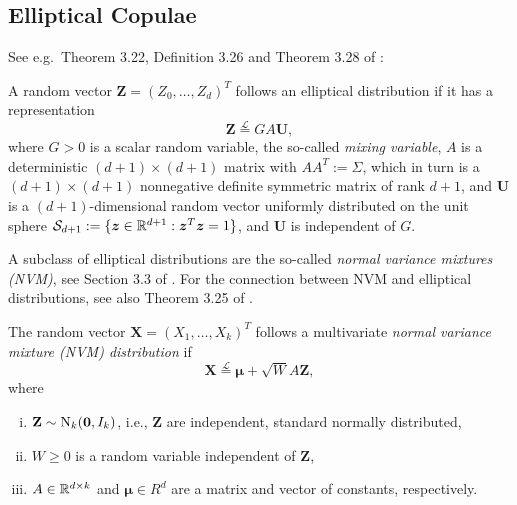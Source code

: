 \subsection{Elliptical Copulae}\label{subsec:elliptical-copulae}


\providecommand{\bZ}{\ensuremath{\bm{Z}}}
\providecommand{\bU}{\ensuremath{\bm{U}}}
\providecommand{\bu}{\ensuremath{\bm{u}}}

See e.g.\ Theorem 3.22, Definition 3.26 and Theorem 3.28 of
\citep{McNeil2005}:
\begin{definition}
  A random vector $\bZ=(Z_0,\ldots, Z_d)^T$ follows an elliptical
  distribution if it has a representation
  \begin{equation*}
    \bZ\stackrel{\mathcal L}= G A \bU,
  \end{equation*}
  where $G>0$ is a scalar random variable, the so-called {\em mixing
  variable}, $A$ is a deterministic $(d+1)\times (d+1)$ matrix with
$A A^T:=\Sigma$, which in turn is a $(d+1)\times (d+1)$ nonnegative
definite symmetric matrix of rank $d+1$, and $\bU$ is a
$(d+1)$-dimensional random vector uniformly distributed on the unit
sphere $\mathcal S_{d+1}:=\{\bm{z}\in {\mathbb{R}}^{d+1}: \bm z^T \bm z=1\}$,
and $\bU$ is independent of $G$.
\end{definition}

A subclass of elliptical distributions are the so-called {\em normal
  variance mixtures (NVM)}, see Section 3.3 of \citep{McNeil2005}. For the
connection between NVM and elliptical distributions, see also Theorem
3.25 of \citep{McNeil2005}. 

\begin{definition}
  The random vector $\mathbf X=(X_1, \ldots, X_k)^T$ follows a
  multivariate {\em normal variance mixture (NVM) distribution} if
  \begin{equation*}
    \mathbf X \stackrel{\mathcal L}{=} \mathbf \mu + \sqrt{W} A\mathbf
    Z, 
  \end{equation*}
  where
  \begin{enumerate}[(i)]
  \item $\mathbf Z\sim {\rm N}_k(\mathbf 0, I_k)$, i.e., $\mathbf Z$ are
    independent, standard normally distributed,
  \item $W\geq 0$ is a random variable independent of $\mathbf Z$,
  \item $A\in {\mathbb{R}}^{d\times k}$ and $\mathbf \mu\in R^d$ are a matrix
    and vector of constants, respectively. 
  \end{enumerate}
\end{definition}

